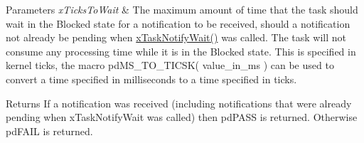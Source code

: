\begin{DoxyParams}{Parameters}
\hline
{\em x\+Ticks\+To\+Wait} & The maximum amount of time that the task should wait in the Blocked state for a notification to be received, should a notification not already be pending when \hyperlink{externals_2freertos_2include_2task_8h_a212928744c3d5e0ccc56f1324a3c26f3}{x\+Task\+Notify\+Wait()} was called. The task will not consume any processing time while it is in the Blocked state. This is specified in kernel ticks, the macro pd\+M\+S\+\_\+\+T\+O\+\_\+\+T\+I\+C\+S\+K( value\+\_\+in\+\_\+ms ) can be used to convert a time specified in milliseconds to a time specified in ticks.\\
\hline
\end{DoxyParams}
\begin{DoxyReturn}{Returns}
If a notification was received (including notifications that were already pending when x\+Task\+Notify\+Wait was called) then pd\+P\+A\+SS is returned. Otherwise pd\+F\+A\+IL is returned. 
\end{DoxyReturn}
